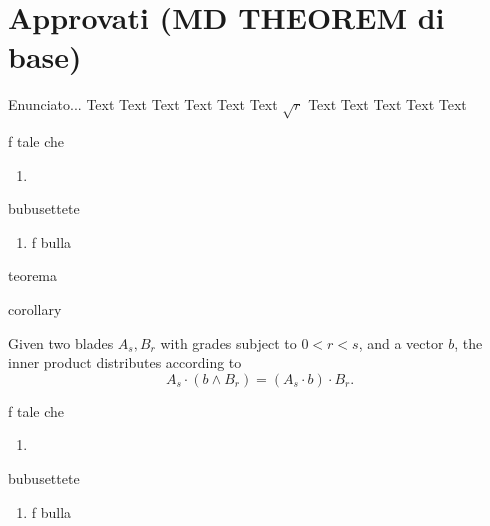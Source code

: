\documentclass[a4paper,12pt]{article}
\begin{document}
\section{Approvati (MD THEOREM di base)}
\lipsum[1]

\begin{lemma}[di coso]
	Enunciato...
Text Text Text Text Text Text $\sqrt{r}$ Text Text Text Text Text

	\begin{hypothesis}
		f tale che
			\begin{enumerate}
				\item 
			\end{enumerate}
	\end{hypothesis}
	
	\begin{thesis}
		bubusettete
			\begin{enumerate}
				\item f bulla
			\end{enumerate}
	\end{thesis}

\end{lemma}%

\begin{teorema}%
teorema
\end{teorema}%

\begin{corollario}%
corollary
\end{corollario}%

\begin{Lemma}\label{thm:stokesTheoremGeometricAlgebraII:1420}
Given two blades $A_s, B_r$ with grades subject to $0 < r < s$, and a vector $b$, the inner product distributes according to
\begin{equation}
    A_s \cdot \left( b \wedge B_r \right) = \left( A_s \cdot b \right) \cdot B_r.
\end{equation}

	\begin{hypothesis}
		f tale che
			\begin{enumerate}
				\item 
			\end{enumerate}
	\end{hypothesis}
	
	\begin{thesis}
		bubusettete
			\begin{enumerate}
				\item f bulla
			\end{enumerate}
	\end{thesis}

\end{Lemma}
\end{document}

